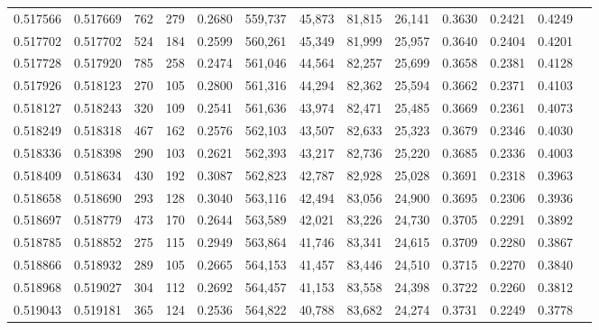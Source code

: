 \begin{tabular}{rrrrrrrrrrrrr}
0.517566 & 0.517669 &   762 &   279 &                                     0.2680 & 559,737 &  45,873 &  81,815 &  26,141 & 0.3630 & 0.2421 & 0.4249 \\
0.517702 & 0.517702 &   524 &   184 &                                     0.2599 & 560,261 &  45,349 &  81,999 &  25,957 & 0.3640 & 0.2404 & 0.4201 \\
0.517728 & 0.517920 &   785 &   258 &                                     0.2474 & 561,046 &  44,564 &  82,257 &  25,699 & 0.3658 & 0.2381 & 0.4128 \\
0.517926 & 0.518123 &   270 &   105 &                                     0.2800 & 561,316 &  44,294 &  82,362 &  25,594 & 0.3662 & 0.2371 & 0.4103 \\
0.518127 & 0.518243 &   320 &   109 &                                     0.2541 & 561,636 &  43,974 &  82,471 &  25,485 & 0.3669 & 0.2361 & 0.4073 \\
0.518249 & 0.518318 &   467 &   162 &                                     0.2576 & 562,103 &  43,507 &  82,633 &  25,323 & 0.3679 & 0.2346 & 0.4030 \\
0.518336 & 0.518398 &   290 &   103 &                                     0.2621 & 562,393 &  43,217 &  82,736 &  25,220 & 0.3685 & 0.2336 & 0.4003 \\
0.518409 & 0.518634 &   430 &   192 &                                     0.3087 & 562,823 &  42,787 &  82,928 &  25,028 & 0.3691 & 0.2318 & 0.3963 \\
0.518658 & 0.518690 &   293 &   128 &                                     0.3040 & 563,116 &  42,494 &  83,056 &  24,900 & 0.3695 & 0.2306 & 0.3936 \\
0.518697 & 0.518779 &   473 &   170 &                                     0.2644 & 563,589 &  42,021 &  83,226 &  24,730 & 0.3705 & 0.2291 & 0.3892 \\
0.518785 & 0.518852 &   275 &   115 &                                     0.2949 & 563,864 &  41,746 &  83,341 &  24,615 & 0.3709 & 0.2280 & 0.3867 \\
0.518866 & 0.518932 &   289 &   105 &                                     0.2665 & 564,153 &  41,457 &  83,446 &  24,510 & 0.3715 & 0.2270 & 0.3840 \\
0.518968 & 0.519027 &   304 &   112 &                                     0.2692 & 564,457 &  41,153 &  83,558 &  24,398 & 0.3722 & 0.2260 & 0.3812 \\
0.519043 & 0.519181 &   365 &   124 &                                     0.2536 & 564,822 &  40,788 &  83,682 &  24,274 & 0.3731 & 0.2249 & 0.3778 \\

\end{tabular}
